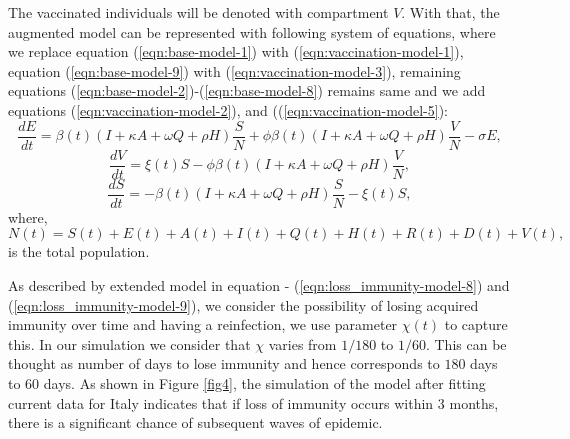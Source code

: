 \documentclass[10pt]{wlscirep}
\begin{document}
The vaccinated individuals will be denoted with compartment $V$. With that, the augmented model can be represented with following system of equations, where we replace equation (\ref{eqn:base-model-1}) with (\ref{eqn:vaccination-model-1}), equation (\ref{eqn:base-model-9}) with (\ref{eqn:vaccination-model-3}), remaining equations (\ref{eqn:base-model-2})-(\ref{eqn:base-model-8}) remains same and we add equations (\ref{eqn:vaccination-model-2}), and ((\ref{eqn:vaccination-model-5}):
%
%
\begin{equation}
\frac{dE}{dt} = \beta(t) \left( I + \kappa A + \omega Q + \rho H \right) \frac{S}{N} + \phi \beta(t) \left( I + \kappa A + \omega Q + \rho H \right) \frac{V}{N} - \sigma E, 
\label{eqn:vaccination-model-1}
\end{equation}
%
%
\begin{equation}
\frac{dV}{dt} =  \xi(t) S - \phi  \beta(t) \left( I + \kappa A + \omega Q + \rho H \right) \frac{V}{N},
\label{eqn:vaccination-model-2}
\end{equation}
\begin{equation}
\frac{dS}{dt} = -\beta(t) \left( I + \kappa A + \omega Q + \rho H \right) \frac{S}{N} - \xi(t) S,
\label{eqn:vaccination-model-3}
\end{equation}
%
%
where,
\begin{equation}
N(t) = S(t) + E(t) + A(t) + I(t) + Q(t) + H(t) + R(t) + D(t) + V(t),
\label{eqn:vaccination-model-5}
\end{equation}
is the total population. 

As described by extended model in equation - (\ref{eqn:loss_immunity-model-8}) and (\ref{eqn:loss_immunity-model-9}), we consider the possibility of losing acquired immunity over time and having a reinfection, we use parameter $\chi(t)$ to capture this. In our simulation we consider that $\chi$ varies from $1/180$ to $1/60$. This can be thought as number of days to lose immunity and hence corresponds to $180$ days to $60$ days. As shown in Figure \ref{fig4}, the simulation of the model after fitting current data for Italy indicates that if loss of immunity occurs within 3 months, there is a significant chance of subsequent waves of epidemic.  
\end{document}
